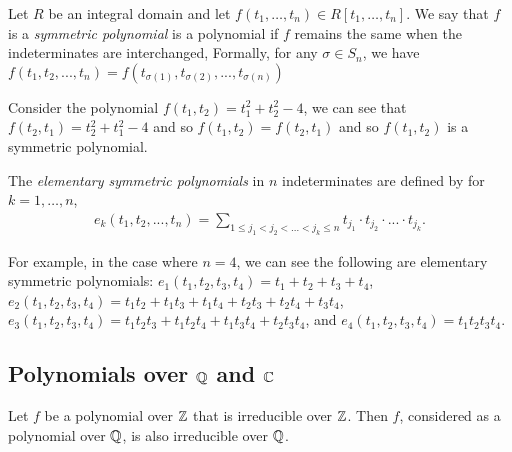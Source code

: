 \begin{definition}
	Let $R$ be an integral domain and let $f(t_1, \dots, t_n) \in R[t_1, \dots, t_n]$. We say that $f$ is
    a \textit{symmetric polynomial} is a polynomial if $f$ remains the same when the indeterminates are interchanged,
    Formally, for any $\sigma \in S_n$, we have $f(t_1,t_2,...,t_n) = f(t_{\sigma(1)},t_{\sigma(2)},...,t_{\sigma(n)})$
\end{definition}

\begin{example}
    Consider the polynomial 
    $f(t_1,t_2)=t_1^2+t_2^2-4$, we can see that $f(t_2,t_1)=t_2^2+t_1^2-4$ and so $f(t_1,t_2)=f(t_2,t_1)$ and so $f(t_1,t_2)$ is a symmetric polynomial.
\end{example}

\begin{definition}
    The \textit{elementary symmetric polynomials} in $n$ indeterminates are defined by for $k = 1, \dots, n$,
    \begin{align*}
    e_k(t_1,t_2,...,t_n) = \sum_{1\leq j_1<j_2<...<j_k\leq n} t_{j_1}\cdot t_{j_2} \cdot ... \cdot t_{j_k}.
    \end{align*}
\end{definition}

\begin{example}
    For example, in the case where $n=4$, we can see the following are elementary symmetric polynomials: $e_1(t_1,t_2,t_3,t_4) = t_1 + t_2 + t_3 + t_4$, $e_2(t_1, t_2, t_3, t_4) = t_1t_2 + t_1t_3 + t_1t_4 + t_2t_3 + t_2t_4 + t_3t_4$,  $e_3(t_1,t_2,t_3,t_4) = t_1t_2t_3+t_1t_2t_4+t_1t_3t_4+t_2t_3t_4$, and $e_4(t_1, t_2, t_3, t_4) = t_1 t_2 t_3 t_4$. 
\end{example}


\subsection{Polynomials over $\mathbb Q$ and $\mathbb C$} 


\begin{lemma}
     Let $f$ be a polynomial over $\mathbb Z$ that is irreducible over $\mathbb Z$. Then $f$, considered as a polynomial over $\mathbb Q$, is also irreducible over $\mathbb Q$.
\end{lemma}

